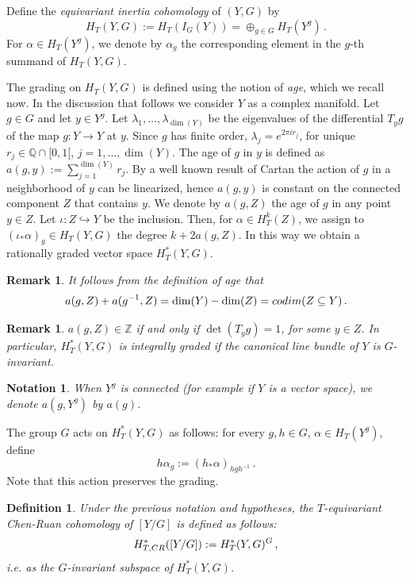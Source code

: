 \documentclass[10pt,a4paper]{amsart}
\newtheorem{dfn}[thm]{Definition}
\newtheorem{rmk}[thm]{Remark}
\newtheorem{notat}{Notation}
\newcommand{\Z}{\mathbb{Z}}
\newcommand{\Q}{\mathbb{Q}}
\newcommand{\1}{\mathds{1}}   %
\begin{document}
Define the \textit{equivariant inertia cohomology} of $(Y, G)$ by
$$
H_T(Y, G) := H_T(I_G(Y))=  \oplus_{g\in G} H_T(Y^g) \, .
$$
For $\alpha \in H_T(Y^g)$, we denote by $\alpha_g$ the corresponding element 
in the $g$-th summand of $H_T(Y, G)$.

The grading on $H_T(Y, G)$ is defined using the notion of \textit{age}, which we recall now.
In the discussion that follows we consider $Y$ as a complex manifold.
Let $g\in G$ and let $y\in Y^g$. Let $\lambda_1, \ldots , \lambda_{\dim (Y)}$ be the eigenvalues of the 
differential $T_yg$ of the map $g\colon Y \to Y$ at $y$. Since $g$ has finite order,  $\lambda_j = e^{2\pi i r_j}$, 
for unique  $r_j \in \Q \cap [0, 1[$, $j=1, \ldots , \dim (Y)$. 
The age of $g$ in $y$ is defined as $a(g, y):= \sum_{j=1}^{\dim (Y)} r_j$.
By a well known result of Cartan the action of $g$ in a neighborhood of $y$  can be linearized, hence
$a(g, y)$ is constant on the connected component $Z$ that contains $y$. We denote by $a(g, Z)$ the age of $g$ in any point 
$y\in Z$.
Let $\iota \colon Z \hookrightarrow Y$ be the inclusion. Then, for   $\alpha \in H^k_T(Z)$, we assign 
to $(\iota_* \alpha)_g \in H_T(Y, G)$ the degree $k + 2a(g, Z)$. In this way we obtain a rationally graded 
vector space $H_T^*(Y, G)$.


\begin{rmk}
It follows from the definition of age that
$$
a(g, Z) + a(g^{-1}, Z) = \dim (Y) - \dim (Z) = {\rm codim} (Z\subseteq Y) \, .
$$
\end{rmk}
\begin{rmk}
$a(g, Z) \in \Z$ if and only if $\det (T_y g)=1$, for some $y\in Z$.
In particular, $H_T^*(Y, G)$ is integrally graded if the canonical line bundle of $Y$ is $G$-invariant.
\end{rmk}

\begin{notat}
When $Y^g$ is connected (for example if $Y$ is a vector space), we denote $a(g, Y^g)$ by $a(g)$.
\end{notat}

The group $G$ acts on $H_T^*(Y, G)$ as follows: for every $g, h \in G$, $\alpha \in H_T(Y^g)$, define 
$$
h \alpha_g := (h_* \alpha)_{hgh^{-1}} \, .
$$ 
Note that this action preserves the grading.

\begin{dfn}\label{TCR}
Under the previous notation and hypotheses, the $T$-equivariant Chen-Ruan cohomology of $[Y/G]$ is defined as follows:
$$
H^*_{T, {\rm CR}}([Y/G]) := H^*_T(Y, G)^G \, ,
$$
i.e. as the $G$-invariant subspace of $H^*_T(Y, G)$.
\end{dfn}
\end{document}
